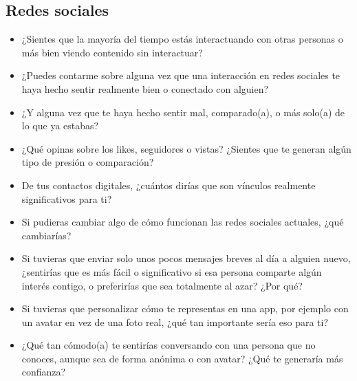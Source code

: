 \subsection{Redes sociales}
\begin{itemize}
    \item ¿Sientes que la mayoría del tiempo estás interactuando con otras personas o más bien viendo contenido sin interactuar?
    \item ¿Puedes contarme sobre alguna vez que una interacción en redes sociales te haya hecho sentir realmente bien o conectado con alguien?
    \item ¿Y alguna vez que te haya hecho sentir mal, comparado(a), o más solo(a) de lo que ya estabas?
    \item ¿Qué opinas sobre los likes, seguidores o vistas? ¿Sientes que te generan algún tipo de presión o comparación?
    \item De tus contactos digitales, ¿cuántos dirías que son vínculos realmente significativos para ti?
    \item Si pudieras cambiar algo de cómo funcionan las redes sociales actuales, ¿qué cambiarías?
    \item Si tuvieras que enviar solo unos pocos mensajes breves al día a alguien nuevo, ¿sentirías que es más fácil o significativo si esa persona comparte algún interés contigo, o preferirías que sea totalmente al azar? ¿Por qué?
    \item Si tuvieras que personalizar cómo te representas en una app, por ejemplo con un avatar en vez de una foto real, ¿qué tan importante sería eso para ti?
    \item ¿Qué tan cómodo(a) te sentirías conversando con una persona que no conoces, aunque sea de forma anónima o con avatar? ¿Qué te generaría más confianza?
\end{itemize}

